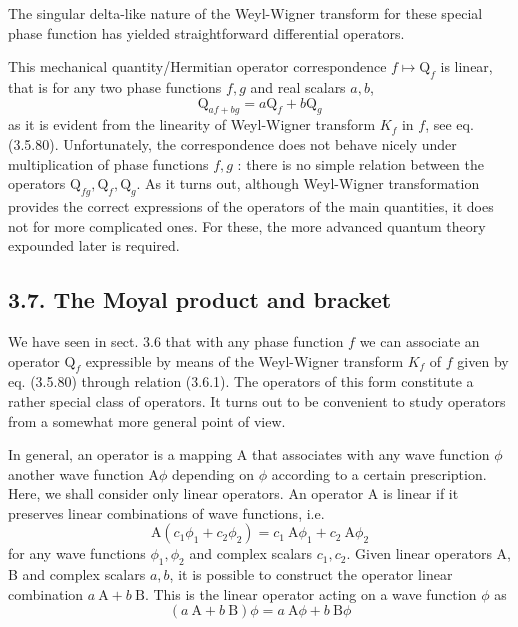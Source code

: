 \documentclass{article}
\begin{document}
The singular delta-like nature of the Weyl-Wigner transform for these special phase function has yielded straightforward differential operators.

This mechanical quantity/Hermitian operator correspondence $f \mapsto \mathrm{Q}_{f}$ is linear, that is for any two phase functions $f, g$ and real scalars $a, b$,
$$
\begin{equation*}
\mathrm{Q}_{a f+b g}=a \mathrm{Q}_{f}+b \mathrm{Q}_{g} \tag{3.6.12}
\end{equation*}
$$
as it is evident from the linearity of Weyl-Wigner transform $K_{f}$ in $f$, see eq. (3.5.80). Unfortunately, the correspondence does not behave nicely under multiplication of phase functions $f, g$ : there is no simple relation between the operators $\mathrm{Q}_{f g}, \mathrm{Q}_{f}, \mathrm{Q}_{g}$. As it turns out, although Weyl-Wigner transformation provides the correct expressions of the operators of the main quantities, it does not for more complicated ones. For these, the more advanced quantum theory expounded later is required.

\subsection*{3.7. The Moyal product and bracket}

We have seen in sect. 3.6 that with any phase function $f$ we can associate an operator $\mathrm{Q}_{f}$ expressible by means of the Weyl-Wigner transform $K_{f}$ of $f$ given by eq. (3.5.80) through relation (3.6.1). The operators of this form constitute a rather special class of operators. It turns out to be convenient to study operators from a somewhat more general point of view.

In general, an operator is a mapping A that associates with any wave function $\phi$ another wave function $\mathrm{A} \phi$ depending on $\phi$ according to a certain prescription. Here, we shall consider only linear operators. An operator A is linear if it preserves linear combinations of wave functions, i.e.
$$
\begin{equation*}
\mathrm{A}\left(c_{1} \phi_{1}+c_{2} \phi_{2}\right)=c_{1} \mathrm{~A} \phi_{1}+c_{2} \mathrm{~A} \phi_{2} \tag{3.7.1}
\end{equation*}
$$
for any wave functions $\phi_{1}, \phi_{2}$ and complex scalars $c_{1}, c_{2}$. Given linear operators A, B and complex scalars $a, b$, it is possible to construct the operator linear combination $a \mathrm{~A}+b \mathrm{~B}$. This is the linear operator acting on a wave function $\phi$ as
$$
\begin{equation*}
(a \mathrm{~A}+b \mathrm{~B}) \phi=a \mathrm{~A} \phi+b \mathrm{~B} \phi \tag{3.7.2}
\end{equation*}
$$
\end{document}
